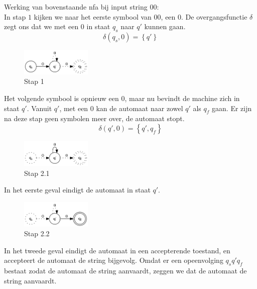 \documentclass[main.tex]{subfiles}
\begin{document}
\begin{vb}
  Werking van bovenstaande nfa bij input string $00$:\\
  In stap $1$ kijken we naar het eerste symbool van $00$, een $0$.
  De overgangsfunctie $\delta$ zegt ons dat we met een $0$ in staat $q_{s}$ naar $q'$ kunnen gaan.
  \[ \delta(q_{s},0) = \left\{q'\right\} \]
  \begin{figure}[H]
    \centering
    \includegraphics[width=0.3\textwidth]{assets/nfa-vb2.png}
    \caption{Stap 1}
    \label{fig:nfa-vb2}
  \end{figure}
  Het volgende symbool is opnieuw een $0$, maar nu bevindt de machine zich in staat $q'$.
  Vanuit $q'$, met een $0$ kan de automaat naar zowel $q'$ als $q_{f}$ gaan.
  Er zijn na deze stap geen symbolen meer over, de automaat stopt.
  \[ \delta(q',0) = \left\{q',q_{f}\right\} \]
  \begin{figure}[H]
    \centering
    \includegraphics[width=0.3\textwidth]{assets/nfa-vb3.png}
    \caption{Stap 2.1}
    \label{fig:nfa-vb3}
  \end{figure}
  In het eerste geval eindigt de automaat in staat $q'$.
  \begin{figure}[H]
    \centering
    \includegraphics[width=0.3\textwidth]{assets/nfa-vb4.png}
    \caption{Stap 2.2}
    \label{fig:nfa-vb4}
  \end{figure}
  In het tweede geval eindigt de automaat in een accepterende toestand, en accepteert de automaat de string bijgevolg.
  Omdat er een opeenvolging $q_{s}q'q_{f}$ bestaat zodat de automaat de string aanvaardt, zeggen we dat de automaat de string aanvaardt.
\end{vb}

\end{document}
